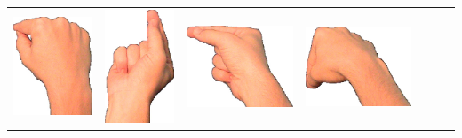 \documentclass{article}
\begin{document}
\begin{center}
\begin{tabular}{r*{6}{c}}
\includegraphics[scale=0.1]{images/09-13-3.jpg}&
\includegraphics[scale=0.1]{images/09-13-4.jpg}&
\includegraphics[scale=0.1]{images/09-13-5.jpg}&
\includegraphics[scale=0.1]{images/09-13-6.jpg}\\

\end{tabular}
\end{center}
\end{document}
